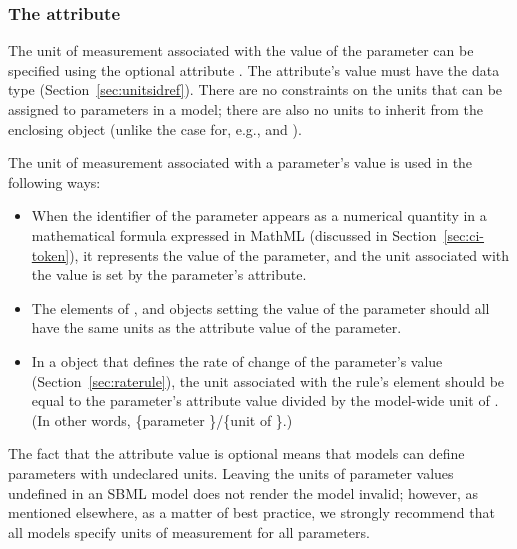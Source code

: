 \subsubsection{The  attribute}
\label{sec:parameter-units}

The unit of measurement associated with the value of the parameter
can be specified using the optional attribute .  The
attribute's value must have the data type 
(Section~\ref{sec:unitsidref}).  There are no constraints on the
units that can be assigned to parameters in a model; there are
also no units to inherit from the enclosing \Model object (unlike
the case for, e.g., \Species and \Compartment).

The unit of measurement associated with a parameter's value is
used in the following ways:
\begin{itemize}

\item When the identifier of the parameter appears as a numerical
  quantity in a mathematical formula expressed in MathML
  (discussed in Section~\ref{sec:ci-token}), it represents the
  value of the parameter, and the unit associated with the value
  is set by the parameter's  attribute.

\item The  elements of \AssignmentRule,
  \InitialAssignment and \EventAssignment objects setting the
  value of the parameter should all have the same units as the
   attribute value of the parameter.

\item In a \RateRule object that defines the rate of change of the
  parameter's value (Section~\ref{sec:raterule}), the unit
  associated with the rule's  element should be equal
  to the parameter's  attribute value divided by the
  model-wide unit of .  (In other words,
  \{parameter \}/\{unit of \}.)

\end{itemize}

The fact that the  attribute value is optional means
that models can define parameters with undeclared units.  Leaving
the units of parameter values undefined in an SBML model does not
render the model invalid; however, as mentioned elsewhere, as a
matter of best practice, we strongly recommend that all models
specify units of measurement for all parameters.



